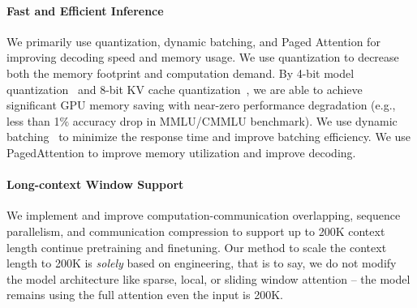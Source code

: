 \paragraph{Fast and Efficient Inference}
We primarily use quantization, dynamic batching, and Paged Attention for improving decoding speed and memory usage.
We use quantization to decrease both the memory footprint and computation demand. 
By 4-bit model quantization~\citep{wu2023understanding} and 8-bit KV cache quantization~\citep{dettmers2022llm}, we are able to achieve significant GPU memory saving with near-zero performance degradation (e.g., less than 1$\%$ accuracy drop in MMLU/CMMLU benchmark). 
We use dynamic batching~\citep{gyeong280922} to minimize the response time and improve batching efficiency.
We use PagedAttention\cite{kwon2023efficient} to improve memory utilization and improve decoding. 



\paragraph{Long-context Window Support} 
We implement and improve computation-communication overlapping, sequence parallelism, and communication compression to support up to 200K context length continue pretraining and finetuning. 
Our method to scale the context length to 200K is \textit{solely} based on engineering, that is to say, we do not modify the model architecture like sparse, local, or sliding window attention -- the model remains using the full attention even the input is 200K.  

